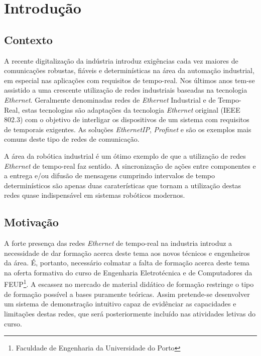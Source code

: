 \chapter{Introdução} \label{chap:intro}




\section{Contexto}\label{sec:contexto}

A recente digitalização da indústria introduz exigências cada vez maiores
de comunicações robustas, fiáveis e determinísticas na área da automação
industrial, em especial nas aplicações com requisitos de tempo-real.
Nos últimos anos tem-se assistido a uma crescente utilização de redes
industriais baseadas na tecnologia \textit{Ethernet}. Geralmente
denominadas redes de \textit{Ethernet} Industrial e de Tempo-Real, estas
tecnologias são adaptações da tecnologia \textit{Ethernet} original (IEEE
802.3) com o objetivo de interligar os dispositivos de um sistema com
requisitos de temporais exigentes. As soluções \textit{EthernetIP},
\textit{Profinet} e \ecat são os exemplos mais comuns deste tipo de redes
de comunicação.

A área da robótica industrial é um ótimo exemplo de que a utilização de
redes \textit{Ethernet} de tempo-real faz sentido. A sincronização de
ações entre componentes e a entrega e/ou difusão de mensagens cumprindo
intervalos de tempo determinísticos são apenas duas caraterísticas que
tornam a utilização destas redes quase indispensável em sistemas robóticos
modernos.


\section{Motivação}\label{sec:motivacao}

A forte presença das redes \textit{Ethernet} de tempo-real na industria
introduz a necessidade de dar formação acerca deste tema aos novos
técnicos e engenheiros da área. É, portanto, necessário colmatar a falta
de formação acerca deste tema na oferta formativa do curso de Engenharia
Eletrotécnica e de Computadores da FEUP\footnote{Faculdade de Engenharia
da Universidade do Porto}. A escassez no mercado de material didático de
formação restringe o tipo de formação possível a bases puramente teóricas.
Assim pretende-se desenvolver um sistema de demonstração intuitivo capaz
de evidênciar as capacidades e limitações destas redes, que será
posteriormente incluído nas atividades letivas do curso.

